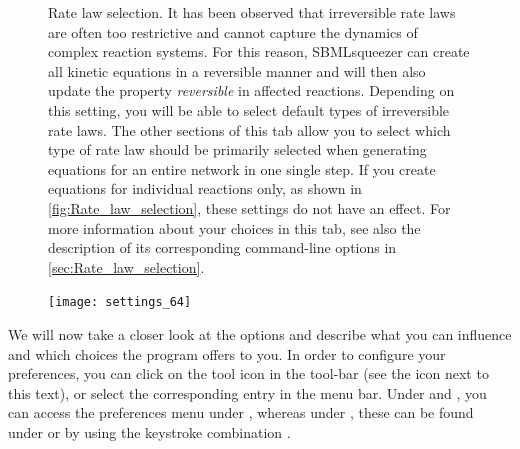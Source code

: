 \begin{figure}
\caption[Rate law selection]{Rate law selection.
It has been observed that irreversible rate laws are
often too restrictive and cannot capture the dynamics of complex reaction systems.
For this reason, SBMLsqueezer can create all kinetic equations in a reversible manner
and will then also update the property \emph{reversible} in affected reactions.
Depending on this setting, you will be able to select default types of irreversible
rate laws.
The other sections of this tab allow you to select which type of rate law should
be primarily selected when generating equations for an entire network in one single
step.
If you create equations for individual reactions only, as shown in \vref{fig:Rate_law_selection},
these settings do not have an effect.  
For more information about your choices in this tab, see also the description of
its corresponding command-line options in \vref{sec:Rate_law_selection}.}
\label{fig:Rate_law_selection}
\end{figure}
\begin{figure}
\vspace{\wrapfigspace}
\texttt{[image: settings\_64]}
\end{figure}
We will now take a closer look at the options and describe what you can influence
and which choices the program offers to you.
In order to configure your preferences, you can click on the tool icon in the
tool-bar (see the icon next to this text), or select the corresponding entry in the menu bar.
Under \Windows and \Linux, you can access the preferences menu under
, whereas
under \MacOSX, these can be found under  or by using the keystroke
combination \keys{\cmd + {$,$}}.

